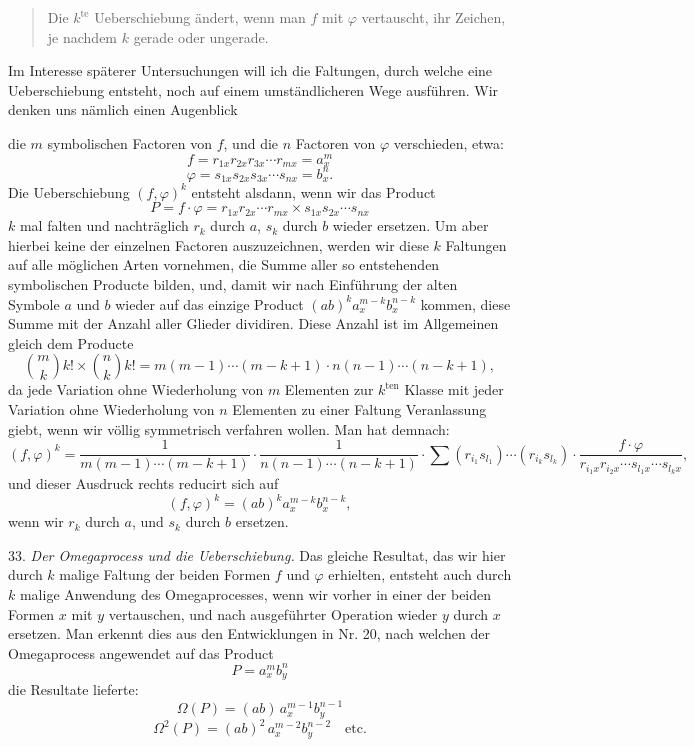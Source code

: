 \begin{quote}
\glqq Die $k^{\text{te}}$ Ueberschiebung ändert, wenn man $f$ mit $\varphi$
vertauscht, ihr Zeichen, je nachdem $k$ gerade oder ungerade.\grqq{}
\end{quote}

Im Interesse späterer Untersuchungen will ich die Faltungen, durch welche
eine Ueberschiebung entsteht, noch auf einem umständlicheren Wege
ausführen. Wir denken uns nämlich einen Augenblick



die $m$ symbolischen Factoren von $f$, und die $n$ Factoren von $\varphi$
verschieden, etwa:
\[
f = r_{1x} r_{2x} r_{3x} \cdots r_{mx} = a_x^m
\]
\[
\varphi = s_{1x} s_{2x} s_{3x} \cdots s_{nx} = b_x^n.
\]
Die Ueberschiebung $(f, \varphi)^k$ entsteht alsdann, wenn wir das Product
\[
P = f \cdot \varphi = r_{1x} r_{2x} \cdots r_{mx} \times s_{1x} s_{2x} \cdots s_{nx}
\]
$k$ mal falten und nachträglich $r_k$ durch $a$, $s_k$ durch $b$ wieder
ersetzen. Um aber hierbei keine der einzelnen Factoren auszuzeichnen, werden
wir diese $k$ Faltungen auf alle möglichen Arten vornehmen, die Summe aller
so entstehenden symbolischen Producte bilden, und, damit wir nach
Einführung der alten Symbole $a$ und $b$ wieder auf das einzige Product
$(ab)^k a_x^{m-k} b_x^{n-k}$ kommen, diese Summe mit der Anzahl aller
Glieder dividiren. Diese Anzahl ist im Allgemeinen gleich dem Producte
\[
\binom{m}{k} k! \times \binom{n}{k} k! = m(m-1) \cdots (m-k+1) \cdot n(n-1) \cdots (n-k+1),
\]
da jede Variation ohne Wiederholung von $m$ Elementen zur $k^{\text{ten}}$
Klasse mit jeder Variation ohne Wiederholung von $n$ Elementen zu einer
Faltung Veranlassung giebt, wenn wir völlig symmetrisch verfahren wollen.
Man hat demnach:
\[
(f, \varphi)^k = \frac{1}{m(m-1) \cdots (m-k+1)} \cdot \frac{1}{n(n-1) \cdots (n-k+1)}
\cdot \sum (r_{i_1} s_{l_1}) \cdots (r_{i_k} s_{l_k}) \cdot \frac{f \cdot \varphi}{r_{i_1 x} r_{i_2 x} \cdots s_{l_1 x} \cdots s_{l_k x}},
\]
und dieser Ausdruck rechts reducirt sich auf
\[
(f, \varphi)^k = (ab)^k a_x^{m-k} b_x^{n-k},
\]
wenn wir $r_k$ durch $a$, und $s_k$ durch $b$ ersetzen.

33. \textit{Der Omegaprocess und die Ueberschiebung.} Das gleiche
Resultat, das wir hier durch $k$ malige Faltung der beiden Formen $f$ und
$\varphi$ erhielten, entsteht auch durch $k$ malige Anwendung des
Omegaprocesses, wenn wir vorher in einer der beiden Formen $x$ mit $y$
vertauschen, und nach ausgeführter Operation wieder $y$ durch $x$
ersetzen. Man erkennt dies aus den Entwicklungen in Nr. 20, nach welchen
der Omegaprocess angewendet auf das Product
\[
P = a_x^m b_y^n
\]
die Resultate lieferte:
\[
\Omega(P) = (ab)\, a_x^{m-1} b_y^{n-1}
\]
\[
\Omega^2(P) = (ab)^2\, a_x^{m-2} b_y^{n-2} \quad \text{etc.}
\]


